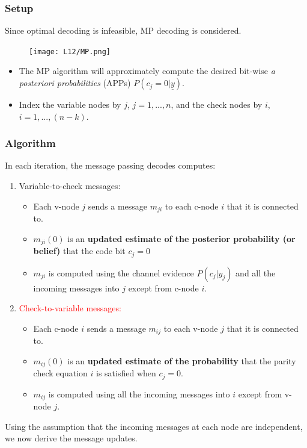 \documentclass[12pt]{article}
\begin{document}
\subsubsection{Setup}
     Since optimal decoding is infeasible, MP decoding is considered.
\begin{figure}[H]
    \centering
    \texttt{[image: L12/MP.png]}
\end{figure}
\begin{itemize}
    \item The MP algorithm will approximately compute the desired bit-wise \textit{a posteriori probabilities} (APPs) $P(c_j=0|\underline{y})$.
    \item Index the variable nodes by $j$, $j=1,...,n$, and the check nodes by $i$, $i=1,...,(n-k)$.
\end{itemize}
\subsubsection{Algorithm}
In each iteration, the message passing decodes computes:
\begin{enumerate}[label={\arabic*)}]
    \item \textcolor{blue1}{Variable-to-check messages:}
    \begin{itemize}
        \item Each v-node $j$ sends a message $m_{ji}$ to each c-node $i$ that it is connected to.
        \item $m_{ji}(0)$ is an \textbf{updated estimate of the posterior probability (or belief)} that the code bit $c_j=0$
        \item $m_{ji}$ is computed using the channel evidence $P(c_j|y_j)$ and all the incoming messages into $j$ except from c-node $i$.
    \end{itemize} 
    \item \textcolor{red}{Check-to-variable messages:}
    \begin{itemize}
        \item Each c-node $i$ sends a message $m_{ij}$ to each v-node $j$ that it is connected to.
        \item $m_{ij}(0)$ is an \textbf{updated estimate of the probability} that the parity check equation $i$ is satisfied when $c_j=0$.
        \item $m_{ij}$ is computed using all the incoming messages into $i$ except from v-node $j$.
    \end{itemize}
\end{enumerate}
Using the assumption that the incoming messages at each node are independent, we now derive the message updates.
\end{document}
